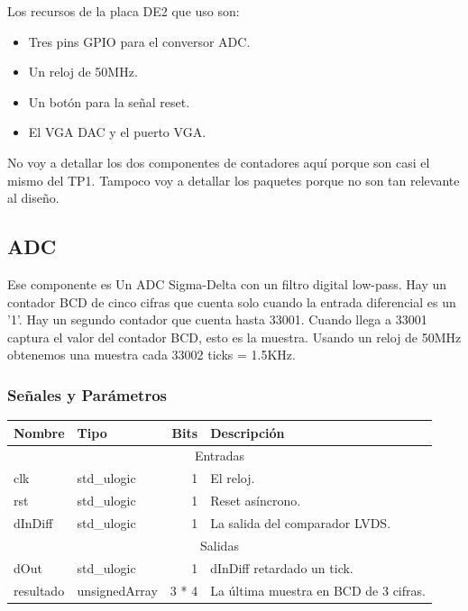 \documentclass[a4paper]{article}
\begin{document}
\vspace{0.4cm}

Los recursos de la placa DE2 que uso son:
\begin{itemize}[nosep]
\item Tres pins GPIO para el conversor ADC.
\item Un reloj de 50MHz.
\item Un botón para la señal reset.
\item El VGA DAC y el puerto VGA.
\end{itemize}

\vspace{0.4cm}

No voy a detallar los dos componentes de contadores aquí porque son casi el mismo del TP1. Tampoco voy a detallar los paquetes porque no son tan relevante al diseño.

\subsection{ADC}

Ese componente es Un ADC Sigma-Delta con un filtro digital low-pass. Hay un contador BCD de cinco cifras que cuenta solo cuando la entrada diferencial es un '1'. Hay un segundo contador que cuenta hasta 33001. Cuando llega a 33001 captura el valor del contador BCD, esto es la muestra. Usando un reloj de 50MHz obtenemos una muestra cada 33002 ticks = 1.5KHz.

\subsubsection{Señales y Parámetros}

\begin{tabular}{| l | l | r | l |}
\hline
\textbf{Nombre} & \textbf{Tipo} & \textbf{Bits} & \textbf{Descripción} \\ \hline
\multicolumn{4}{|c|}{Entradas} \\ \hline
clk & std\_ulogic & 1 & El reloj. \\ 
rst & std\_ulogic & 1 & Reset asíncrono. \\
dInDiff & std\_ulogic & 1 & La salida del comparador LVDS. \\ \hline
\multicolumn{4}{|c|}{Salidas} \\ \hline
dOut & std\_ulogic & 1 & dInDiff retardado un tick. \\ 
resultado & unsignedArray & 3 * 4 & La última muestra en BCD de 3 cifras. \\ \hline
\end{tabular}
\end{document}
